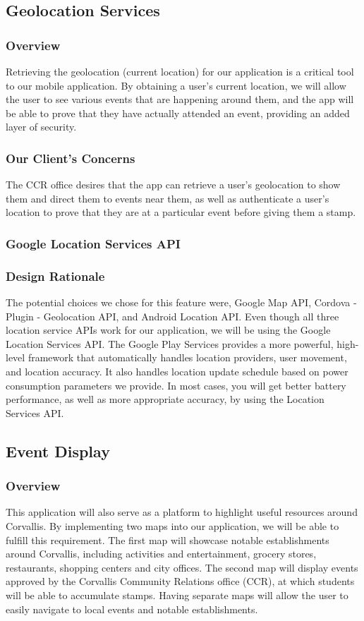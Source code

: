 \documentclass[draftclsnofoot, onecolumn, 10pt, compsoc]{IEEEtran}
\begin{document}
		\subsection{Geolocation Services}
			\subsubsection{Overview}
				Retrieving the geolocation (current location) for our application is a critical tool to our mobile application. By obtaining a user's current location, we will allow the user to see various events that are happening around them, and the app will be able to prove that they have actually attended an event, providing an added layer of security. 
			\subsubsection{Our Client's Concerns}
				The CCR office desires that the app can retrieve a user's geolocation to show them and direct them to events near them, as well as authenticate a user's location to prove that they are at a particular event before giving them a stamp.
			\subsubsection{Google Location Services API}
			\subsubsection{Design Rationale}
				The potential choices we chose for this feature were, Google Map API, Cordova - Plugin - Geolocation API, and Android Location API. Even though all three location service APIs work for our application, we will be using the Google Location Services API. The Google Play Services provides a more powerful, high-level framework that automatically handles location providers, user movement, and location accuracy. It also handles location update schedule based on power consumption parameters we provide. In most cases, you will get better battery performance, as well as more appropriate accuracy, by using the Location Services API.
				
		\subsection{Event Display}
			\subsubsection{Overview}
				This application will also serve as a platform to highlight useful resources around Corvallis. By implementing two maps into our application, we will be able to fulfill this requirement. The first map will showcase notable establishments around Corvallis, including activities and entertainment, grocery stores, restaurants, shopping centers and city offices. The second map will display events approved by the Corvallis Community Relations office (CCR), at which students will be able to accumulate stamps. Having separate maps will allow the user to easily navigate to local events and notable establishments. 
\end{document}
